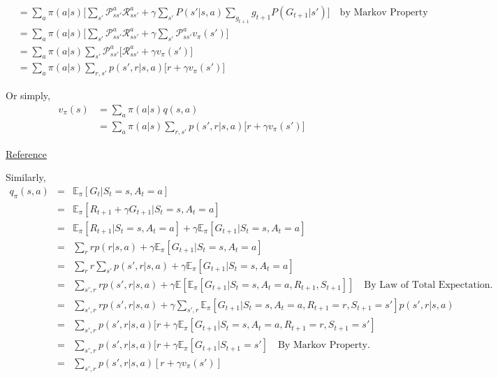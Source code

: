 \begin{appendices}
\begin{align*}
&=\sum_a \pi(a|s)\Bigg[\sum_{s'} \mathcal{P}_{ss'}^a\mathcal{R}_{ss'}^a + \gamma \sum_{s'}P(s'| s, a)\sum_{g_{t+1}}g_{t+1}P( G_{t+1}|s')\Bigg] \quad \textrm{by Markov Property}\\
&=\sum_a \pi(a|s)\Bigg[\sum_{s'} \mathcal{P}_{ss'}^a\mathcal{R}_{ss'}^a + \gamma \sum_{s'}\mathcal{P}_{ss'}^a v_\pi(s')\Bigg] \\
&=\sum_a \pi(a|s)\sum_{s'}\mathcal{P}_{ss'}^a\Bigg[\mathcal{R}_{ss'}^a + \gamma  v_\pi(s')\Bigg] \\
&=\sum_a \pi(a|s)\sum_{r,s'}p(s',r|s,a)\Big[r + \gamma  v_\pi(s')\Big] 
\end{align*}

Or simply, 
\begin{align*}
	v_\pi(s) &= \sum_a \pi(a|s)q(s,a)\\
	&=\sum_a \pi(a|s)\sum_{r,s'}p(s',r|s,a)\Big[r + \gamma  v_\pi(s')\Big] 
\end{align*}

\href{https://stats.stackexchange.com/questions/243384/deriving-bellmans-equation-in-reinforcement-learning}{Reference}

Similarly,
\begin{eqnarray*}
q_\pi(s,a) &=& \mathbb{E}_\pi[G_t|S_t=s,A_t=a]\\
&=&\mathbb{E}_\pi[R_{t+1} + \gamma G_{t+1}|S_t=s,A_t=a]\\
&=&\mathbb{E}_\pi[R_{t+1}|S_t=s,A_t=a] + \gamma\mathbb{E}_\pi[G_{t+1}|S_t=s,A_t=a]\\
&=&\sum_r rp(r|s,a) + \gamma\mathbb{E}_\pi[G_{t+1}|S_t=s,A_t=a]\\
&=&\sum_r r\sum_{s'}p(s',r|s,a) + \gamma\mathbb{E}_\pi[G_{t+1}|S_t=s,A_t=a]\\
&=&\sum_{s',r}rp(s',r|s,a) + \gamma\mathbb{E}[\mathbb{E}_\pi[G_{t+1}|S_t=s,A_t=a,R_{t+1},S_{t+1}]] \quad \text{By Law of Total Expectation.}\\
&=&\sum_{s',r} rp(s',r|s,a) + \gamma\sum_{s',r}\mathbb{E}_\pi[G_{t+1}|S_t=s,A_t=a,R_{t+1}=r,S_{t+1}=s']p(s',r|s,a)\\
&=&\sum_{s',r} p(s',r|s,a)[r + \gamma\mathbb{E}_\pi[G_{t+1}|S_t=s,A_t=a,R_{t+1}=r,S_{t+1}=s']\\
	&=&\sum_{s',r} p(s',r|s,a)[r + \gamma\mathbb{E}_\pi[G_{t+1}|S_{t+1}=s'] \quad \text{By Markov Property.}\\
&=&\sum_{s',r} p(s',r|s,a)[r + \gamma v_\pi(s')]\\
\end{eqnarray*}


\end{appendices}
